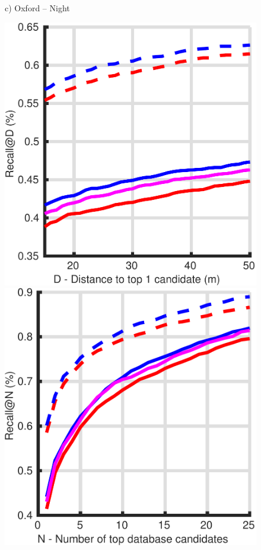 \begin{figure}
\begin{minipage}{0.16\linewidth}
		c) Oxford -- Night
	\end{minipage}
	\begin{minipage}{0.16\linewidth}
		\center \scriptsize
		\includegraphics[width=\linewidth]{plot/oxf_cmu/Results_cmu_lt/distance}	
		
		\includegraphics[width=\linewidth]{plot/oxf_cmu/Results_cmu_lt/recall}
		

\end{minipage}
\end{figure}
